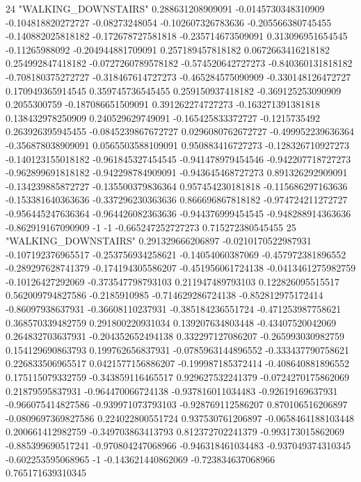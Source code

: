 24 "WALKING_DOWNSTAIRS" 0.288631208909091 -0.0145730348310909 -0.104818820272727 -0.08273248054 -0.102607326783636 -0.205566380745455 -0.140882025818182 -0.172678727581818 -0.235714673509091 0.313096951654545 -0.11265988092 -0.204944881709091 0.257189457818182 0.0672663416218182 0.254992847418182 -0.0727260789578182 -0.574520642727273 -0.840360131818182 -0.708180375272727 -0.318467614727273 -0.465284575090909 -0.330148126472727 0.170949365914545 0.359745736545455 0.259150937418182 -0.369125253090909 0.2055300759 -0.187086651509091 0.391262274727273 -0.163271391381818 0.138432978250909 0.240529629749091 -0.165425833372727 -0.1215735492 0.263926395945455 -0.0845239867672727 0.0296080762672727 -0.499952239636364 -0.356878038909091 0.0565503588109091 0.950883416727273 -0.128326710927273 -0.140123155018182 -0.961845327454545 -0.941478979454546 -0.942207718727273 -0.962899691818182 -0.942298784909091 -0.943645468727273 0.891326292909091 -0.134239885872727 -0.135500379836364 0.957454230181818 -0.115686297163636 -0.153381640363636 -0.337296230363636 0.866696867818182 -0.974724211272727 -0.956445247636364 -0.964426082363636 -0.944376999454545 -0.948288914363636 -0.862919167090909 -1 -1 -0.665247252727273 0.715272380545455
25 "WALKING_DOWNSTAIRS" 0.291329666206897 -0.0210170522987931 -0.107192376965517 -0.253756934258621 -0.14054060387069 -0.457972381896552 -0.289297628741379 -0.174194305586207 -0.451956061724138 -0.0413461275982759 -0.10126427292069 -0.373547798793103 0.211947489793103 0.122826095515517 0.562009794827586 -0.2185910985 -0.714629286724138 -0.852812975172414 -0.86097938637931 -0.36608110237931 -0.385184236551724 -0.471253987758621 0.368570339482759 0.291800220931034 0.139207634803448 -0.43407520042069 0.264832703637931 -0.204352652494138 0.332297127086207 -0.265993030982759 0.154129690863793 0.199762656837931 -0.0785963144896552 -0.333437790758621 0.226833506965517 0.0421577156886207 -0.199987185372414 -0.408640881896552 0.175115079332759 -0.343859116465517 0.929627532241379 -0.0724270175862069 0.21879595837931 -0.964470066724138 -0.937816011034483 -0.92619169637931 -0.966075414827586 -0.939971073793103 -0.928769112586207 0.870106516206897 -0.0809697369827586 0.224022800551724 0.937530761206897 -0.0658464188103448 0.200661412982759 -0.349703863413793 0.812372702241379 -0.993173015862069 -0.885399690517241 -0.970804247068966 -0.946318461034483 -0.937049374310345 -0.602253595068965 -1 -0.143621440862069 -0.723834637068966 0.765171639310345
